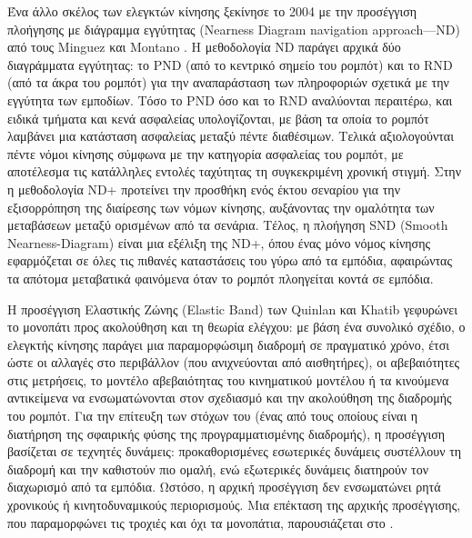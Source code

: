 Ένα άλλο σκέλος των ελεγκτών κίνησης ξεκίνησε το 2004 με την προσέγγιση
πλοήγησης με διάγραμμα εγγύτητας (Nearness Diagram navigation approach---ND)
από τους Minguez και Montano \cite{Mingueza}.  Η μεθοδολογία ND παράγει αρχικά
δύο διαγράμματα εγγύτητας: το PND (από το κεντρικό σημείο του ρομπότ) και το
RND (από τα άκρα του ρομπότ) για την αναπαράσταση των πληροφοριών σχετικά με
την εγγύτητα των εμποδίων.  Τόσο το PND όσο και το RND αναλύονται περαιτέρω,
και ειδικά τμήματα και κενά ασφαλείας υπολογίζονται, με βάση τα οποία το ρομπότ
λαμβάνει μια κατάσταση ασφαλείας μεταξύ πέντε διαθέσιμων. Τελικά αξιολογούνται
πέντε νόμοι κίνησης σύμφωνα με την κατηγορία ασφαλείας του ρομπότ, με
αποτέλεσμα τις κατάλληλες εντολές ταχύτητας τη συγκεκριμένη χρονική στιγμή.
Στην \cite{Minguez2004a} η μεθοδολογία ND+ προτείνει την προσθήκη ενός έκτου
σεναρίου για την εξισορρόπηση της διαίρεσης των νόμων κίνησης, αυξάνοντας την
ομαλότητα των μεταβάσεων μεταξύ ορισμένων από τα σενάρια. Τέλος, η πλοήγηση SND
(Smooth Nearness-Diagram) είναι μια εξέλιξη της ND+, όπου ένας μόνο νόμος
κίνησης εφαρμόζεται σε όλες τις πιθανές καταστάσεις του γύρω από τα εμπόδια,
αφαιρώντας τα απότομα μεταβατικά φαινόμενα όταν το ρομπότ πλοηγείται κοντά σε
εμπόδια.

Η προσέγγιση Ελαστικής Ζώνης (Elastic Band) των Quinlan και Khatib
\cite{Quinlan} γεφυρώνει το μονοπάτι προς ακολούθηση και τη θεωρία ελέγχου: με
βάση ένα συνολικό σχέδιο, ο ελεγκτής κίνησης παράγει μια παραμορφώσιμη διαδρομή
σε πραγματικό χρόνο, έτσι ώστε οι αλλαγές στο περιβάλλον (που ανιχνεύονται από
αισθητήρες), οι αβεβαιότητες στις μετρήσεις, το μοντέλο αβεβαιότητας του
κινηματικού μοντέλου ή τα κινούμενα αντικείμενα να ενσωματώνονται στον
σχεδιασμό και την ακολούθηση της διαδρομής του ρομπότ. Για την επίτευξη των
στόχων του (ένας από τους οποίους είναι η διατήρηση της σφαιρικής φύσης της
προγραμματισμένης διαδρομής), η προσέγγιση βασίζεται σε τεχνητές δυνάμεις:
προκαθορισμένες εσωτερικές δυνάμεις συστέλλουν τη διαδρομή και την καθιστούν
πιο ομαλή, ενώ εξωτερικές δυνάμεις διατηρούν τον διαχωρισμό από τα εμπόδια.
Ωστόσο, η αρχική προσέγγιση δεν ενσωματώνει ρητά χρονικούς ή κινητοδυναμικούς
περιορισμούς. Μια επέκταση της αρχικής προσέγγισης, που παραμορφώνει τις
τροχιές και όχι τα μονοπάτια, παρουσιάζεται στο \cite{Kurniawati2007}.

